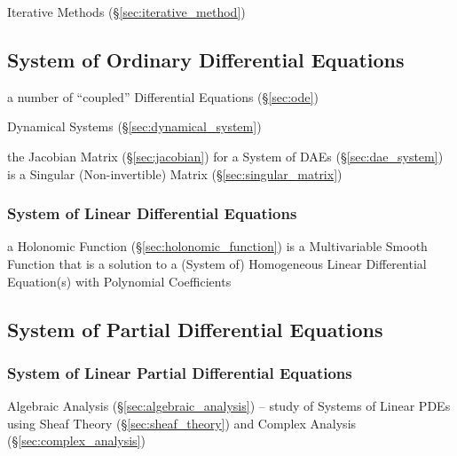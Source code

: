 \fist Iterative Methods (\S\ref{sec:iterative_method})



\subsection{System of Ordinary Differential Equations}\label{sec:ode_system}

a number of ``coupled'' Differential Equations (\S\ref{sec:ode})

\fist Dynamical Systems (\S\ref{sec:dynamical_system})

\fist the Jacobian Matrix (\S\ref{sec:jacobian}) for a System of DAEs
(\S\ref{sec:dae_system}) is a Singular (Non-invertible) Matrix
(\S\ref{sec:singular_matrix})



\subsubsection{System of Linear Differential Equations}
\label{sec:linear_ode_system}

a Holonomic Function (\S\ref{sec:holonomic_function}) is a Multivariable Smooth
Function that is a solution to a (System of) Homogeneous Linear Differential
Equation(s) with Polynomial Coefficients



\subsection{System of Partial Differential Equations}\label{sec:pde_system}

\subsubsection{System of Linear Partial Differential Equations}
\label{sec:linear_pde_system}

\fist Algebraic Analysis (\S\ref{sec:algebraic_analysis}) -- study of Systems of
Linear PDEs using Sheaf Theory (\S\ref{sec:sheaf_theory}) and Complex Analysis
(\S\ref{sec:complex_analysis})



